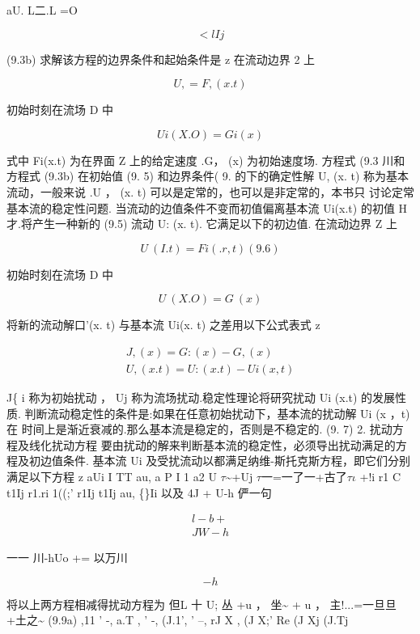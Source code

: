 aU. L二.L =O

\[<lIj\]

(9.3b) 求解该方程的边界条件和起始条件是 z 在流动边界 2 上

\begin{equation*}U, = F,(x. t)\tag{9.4}\end{equation*}

初始时刻在流场 D 中

\[Ui(X.O) = Gi(x)\]

式中 Fi(x.t) 为在界面 Z 上的给定速度 .G， (x) 为初始速度场. 方程式 (9.3 川和方程式 (9.3b) 在初始值 (9. 5) 和边界条件( 9. 的下的确定性解 U, (x. t) 称为基本流动，一般来说 .U ， (x. t) 可以是定常的，也可以是非定常的，本书只 讨论定常基本流的稳定性问题. 当流动的边值条件不变而初值偏离基本流 Ui(x.t) 的初值 H才.将产生一种新的 (9.5) 流动 U: (x. t). 它满足以下的初边值. 在流动边界 Z 上

\[U~(I.t) = Fi(.r ,t) (9. 6)\]

初始时刻在流场 D 中

\[U~(X.O) = G~(x)\]

将新的流动解口'(x. t) 与基本流 Ui(x. t) 之差用以下公式表式 z

\begin{gather*}
J, (x) = G:(x) - G, (x)\tag{9.8a}\\
U ,(x. t) = U:(x. t) - Ui(x ,t)\tag{9.8b}
\end{gather*}

J\{ i 称为初始扰动 ， Uj 称为流场扰动.稳定性理论将研究扰动 Ui (x.t) 的发展性质. 判断流动稳定性的条件是:如果在任意初始扰动下，基本流的扰动解 Ui (x ，t) 在 时间上是渐近衰减的.那么基本流是稳定的，否则是不稳定的. (9. 7) 2. 扰动方程及线化扰动方程 要由扰动的解来判断基本流的稳定性，必须导出扰动满足的方程及初边值条件. 基本流 Ui 及受扰流动以都满足纳维-斯托克斯方程，即它们分别满足以下方程 z aUi I TT au, a P I 1 a2 U $\tau$\textasciitilde{}+Uj $\tau$一=一了一+古了$\tau$$\iota$ +!i r1 C t1Ij r1.ri 1((;' r1Ij t1Ij au, \{\}Ii 以及 4J + U-h 俨一句

\begin{gather*}
l-b +\\
JW-h
\end{gather*}

一一 川-hUo += 以万川

\[-h\]

将以上两方程相减得扰动方程为 但L 十 U; 丛 +u ， 坐\textasciitilde{} + u ， 主!...=一旦旦+土之\textasciitilde{} (9.9a) ,11 ' -, a.T , ' -, (J.1', ' --, rJ X , (J X;' Re (J Xj (J.Tj

